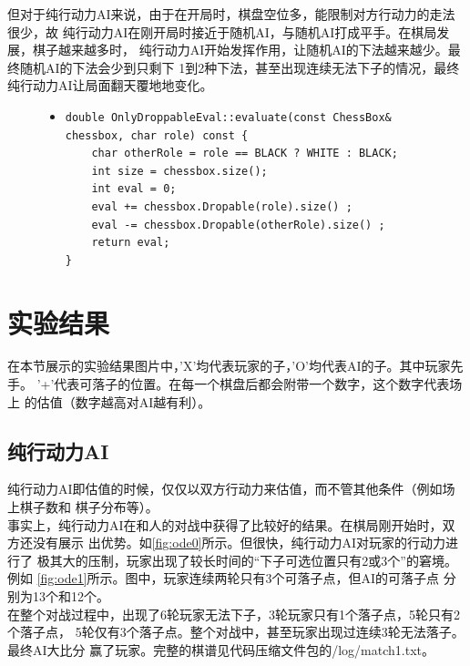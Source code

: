 \documentclass[a4paper]{article}
\begin{document}
但对于纯行动力AI来说，由于在开局时，棋盘空位多，能限制对方行动力的走法很少，故
纯行动力AI在刚开局时接近于随机AI，与随机AI打成平手。在棋局发展，棋子越来越多时，
纯行动力AI开始发挥作用，让随机AI的下法越来越少。最终随机AI的下法会少到只剩下
1到2种下法，甚至出现连续无法下子的情况，最终纯行动力AI让局面翻天覆地地变化。

\begin{figure}[!hbt]
\begin{itemize}
\item[] \begin{lstlisting}[style=mycpp, label=lst:ode, caption=纯行动力估值算法]
double OnlyDroppableEval::evaluate(const ChessBox& chessbox, char role) const {
    char otherRole = role == BLACK ? WHITE : BLACK;
    int size = chessbox.size();
    int eval = 0;
    eval += chessbox.Dropable(role).size() ;
    eval -= chessbox.Dropable(otherRole).size() ;
    return eval;
}
\end{lstlisting}
\end{itemize}
\end{figure}

\section{实验结果}
在本节展示的实验结果图片中，'X'均代表玩家的子，'O'均代表AI的子。其中玩家先手。
'+'代表可落子的位置。在每一个棋盘后都会附带一个数字，这个数字代表场上
的估值（数字越高对AI越有利）。
\subsection{纯行动力AI}
纯行动力AI即估值的时候，仅仅以双方行动力来估值，而不管其他条件（例如场上棋子数和
棋子分布等）。\\

事实上，纯行动力AI在和人的对战中获得了比较好的结果。在棋局刚开始时，双方还没有展示
出优势。如\autoref{fig:ode0}所示。但很快，纯行动力AI对玩家的行动力进行了
极其大的压制，玩家出现了较长时间的``下子可选位置只有2或3个''的窘境。例如
\autoref{fig:ode1}所示。图中，玩家连续两轮只有3个可落子点，但AI的可落子点
分别为13个和12个。\\

在整个对战过程中，出现了6轮玩家无法下子，3轮玩家只有1个落子点，5轮只有2个落子点，
5轮仅有3个落子点。整个对战中，甚至玩家出现过连续3轮无法落子。最终AI大比分
赢了玩家。完整的棋谱见代码压缩文件包的/log/match1.txt。
\end{document}
